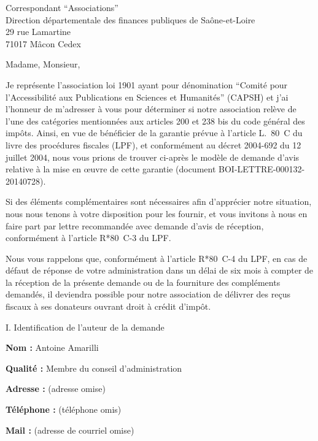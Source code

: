 \documentclass[11pt]{lettre}
\makeatletter
\newcommand*{\NoRule}{\renewcommand*{\rule@length}{0}}
\makeatother
\begin{document}
\begin{letter}{Correspondant ``Associations''\\Direction départementale des finances publiques de Saône-et-Loire\\29 rue Lamartine\\71017 Mâcon Cedex}
\NoRule
{}
\signature{}
\address{Antoine Amarilli (adresse omise)}
\nofax
{}
\telephone{}
\email{}
\opening{Madame, Monsieur,}

  Je représente l'association loi 1901 ayant pour dénomination ``Comité pour
  l'Accessibilité aux Publications en Sciences et Humanités'' (CAPSH) et j'ai
  l'honneur de m'adresser à vous pour déterminer si notre association relève de
  l'une des catégories mentionnées aux articles 200 et 238 bis du code général
  des impôts. Ainsi, en vue de bénéficier de la garantie prévue à l'article
  L.~80~C du livre des procédures fiscales (LPF), et conformément au décret
  2004-692 du 12 juillet 2004, nous vous prions de trouver ci-après le modèle de
  demande d'avis relative à la mise en œuvre de cette garantie (document
  BOI-LETTRE-000132-20140728).

  Si des éléments complémentaires sont nécessaires afin d'apprécier notre
  situation, nous nous tenons à votre disposition pour les
  fournir, et vous invitons à nous en faire part par lettre recommandée avec
  demande d'avis de réception, conformément à l'article R*80~C-3 du LPF.

  Nous vous rappelons que, conformément à l'article R*80~C-4 du LPF, en cas de
  défaut de réponse de votre administration dans un délai de six mois à compter
  de la réception de la présente demande ou de la fourniture des compléments
  demandés, il deviendra possible pour notre association de délivrer des reçus
  fiscaux à ses donateurs ouvrant droit à crédit d'impôt.

  \newpage

  {\Large I. Identification de l'auteur de la demande}

  \textbf{Nom :} Antoine Amarilli

  \textbf{Qualité :} Membre du conseil d'administration

  \textbf{Adresse :} (adresse omise)

  \textbf{Téléphone :} (téléphone omis)

  \textbf{Mail :} (adresse de courriel omise)


\end{letter}
\end{document}
